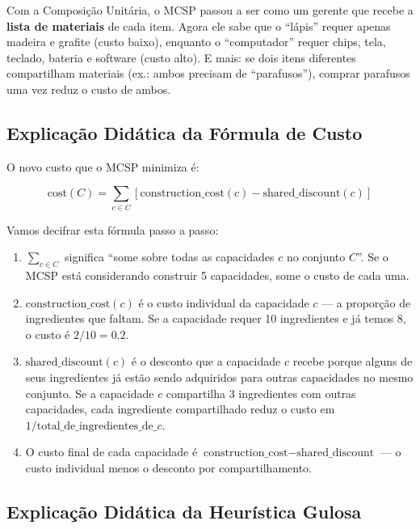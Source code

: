 Com a Composição Unitária, o MCSP passou a ser como um gerente que recebe a \textbf{lista de materiais} de cada item. Agora ele sabe que o ``lápis'' requer apenas madeira e grafite (custo baixo), enquanto o ``computador'' requer chips, tela, teclado, bateria e software (custo alto). E mais: se dois itens diferentes compartilham materiais (ex.: ambos precisam de ``parafusos''), comprar parafusos uma vez reduz o custo de ambos.

\subsection{Explicação Didática da Fórmula de Custo}

O novo custo que o MCSP minimiza é:

\begin{equation}
\text{cost}(C) = \sum_{c \in C} \left[ \text{construction\_cost}(c) - \text{shared\_discount}(c) \right]
\label{eq:mcsp_cost}
\end{equation}

Vamos decifrar esta fórmula passo a passo:

\begin{enumerate}
    \item $\sum_{c \in C}$ significa ``some sobre todas as capacidades $c$ no conjunto $C$''. Se o MCSP está considerando construir 5 capacidades, some o custo de cada uma.
    
    \item $\text{construction\_cost}(c)$ é o custo individual da capacidade $c$ — a proporção de ingredientes que faltam. Se a capacidade requer 10 ingredientes e já temos 8, o custo é $2/10 = 0.2$.
    
    \item $\text{shared\_discount}(c)$ é o desconto que a capacidade $c$ recebe porque alguns de seus ingredientes já estão sendo adquiridos para outras capacidades no mesmo conjunto. Se a capacidade $c$ compartilha 3 ingredientes com outras capacidades, cada ingrediente compartilhado reduz o custo em $1/\text{total\_de\_ingredientes\_de\_}c$.
    
    \item O custo final de cada capacidade é $\text{construction\_cost} - \text{shared\_discount}$ — o custo individual menos o desconto por compartilhamento.
\end{enumerate}

\subsection{Explicação Didática da Heurística Gulosa}

